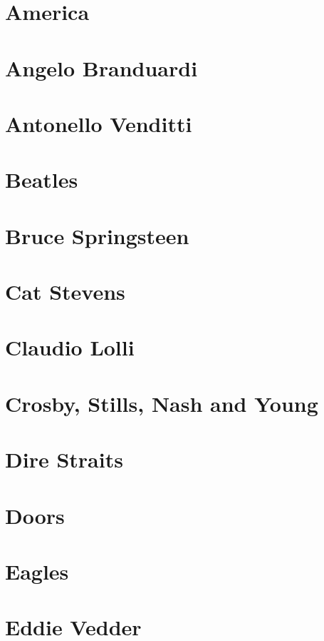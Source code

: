 \chapter{America}

\chapter{Angelo Branduardi}

\chapter{Antonello Venditti}

\chapter{Beatles}

\chapter{Bruce Springsteen}

\chapter{Cat Stevens}

\chapter{Claudio Lolli}

\chapter{Crosby, Stills, Nash and Young}

\chapter{Dire Straits}

\chapter{Doors}

\chapter{Eagles}

\chapter{Eddie Vedder}

